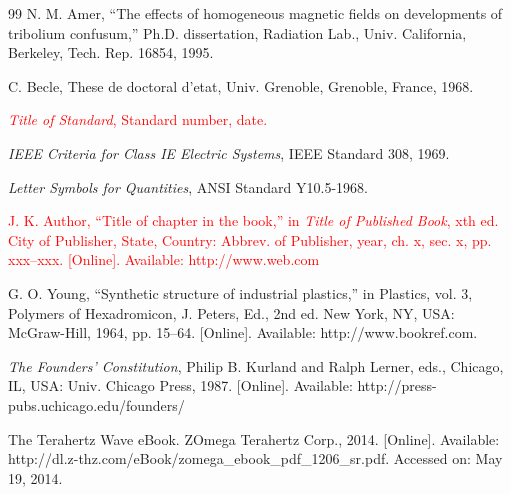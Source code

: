 \documentclass[11pt,a5paper,twoside]{article}
\begin{document}
\begin{thebibliography}{99}
  N. M. Amer, ``The effects of homogeneous magnetic fields on developments of tribolium confusum,'' Ph.D. dissertation, Radiation Lab., Univ. 
California, Berkeley, Tech. Rep. 16854, 1995. 

  C. Becle, These de doctoral d'etat, Univ. Grenoble, Grenoble, France, 1968. 



  \textcolor{red}{
\textit{Title of Standard}, Standard number, date. 
}

  \textit{IEEE Criteria for Class IE Electric Systems}, IEEE Standard 308, 1969. 

  \textit{Letter Symbols for Quantities}, ANSI Standard Y10.5-1968. 




  \textcolor{red}{
J. K. Author, ``Title of chapter in the book,'' in \textit{Title of Published Book}, xth ed. City of Publisher, State, Country: Abbrev. of Publisher, year, ch. x, sec. x, pp. xxx--xxx. [Online]. Available: http://www.web.com 
}

  G. O. Young, ``Synthetic structure of industrial plastics,'' in 
Plastics, vol. 3, Polymers of Hexadromicon, J. Peters, Ed., 2nd ed. New 
York, NY, USA: McGraw-Hill, 1964, pp. 15--64. [Online]. Available: 
http://www.bookref.com.

  \textit{The Founders' Constitution}, Philip B. Kurland and Ralph Lerner, eds., Chicago, IL, USA: Univ. Chicago Press, 1987. [Online]. Available: 
http://press-pubs.uchicago.edu/founders/ 

  The Terahertz Wave eBook. ZOmega Terahertz Corp., 2014. [Online]. Available: 
http://dl.z-thz.com/eBook/zomega{\_}ebook{\_}pdf{\_}1206{\_}sr.pdf. Accessed on: May 19, 2014. 


\end{thebibliography}
\end{document}
